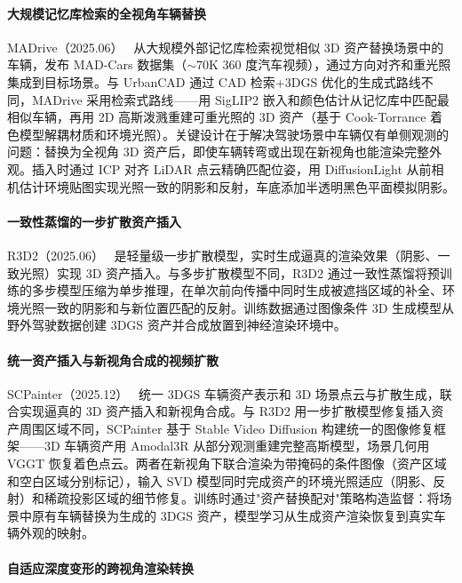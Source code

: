 \paragraph{大规模记忆库检索的全视角车辆替换}

MADrive（2025.06）~\cite{2506_21520} 从大规模外部记忆库检索视觉相似 3D 资产替换场景中的车辆，发布 MAD-Cars 数据集（$\sim$70K 360 度汽车视频），通过方向对齐和重光照集成到目标场景。与 UrbanCAD 通过 CAD 检索+3DGS 优化的生成式路线不同，MADrive 采用检索式路线——用 SigLIP2 嵌入和颜色估计从记忆库中匹配最相似车辆，再用 2D 高斯泼溅重建可重光照的 3D 资产（基于 Cook-Torrance 着色模型解耦材质和环境光照）。关键设计在于解决驾驶场景中车辆仅有单侧观测的问题：替换为全视角 3D 资产后，即使车辆转弯或出现在新视角也能渲染完整外观。插入时通过 ICP 对齐 LiDAR 点云精确匹配位姿，用 DiffusionLight 从前相机估计环境贴图实现光照一致的阴影和反射，车底添加半透明黑色平面模拟阴影。

\paragraph{一致性蒸馏的一步扩散资产插入}

R3D2（2025.06）~\cite{2506_07826} 是轻量级一步扩散模型，实时生成逼真的渲染效果（阴影、一致光照）实现 3D 资产插入。与多步扩散模型不同，R3D2 通过一致性蒸馏将预训练的多步模型压缩为单步推理，在单次前向传播中同时生成被遮挡区域的补全、环境光照一致的阴影和与新位置匹配的反射。训练数据通过图像条件 3D 生成模型从野外驾驶数据创建 3DGS 资产并合成放置到神经渲染环境中。

\paragraph{统一资产插入与新视角合成的视频扩散}

SCPainter（2025.12）~\cite{2512_22706} 统一 3DGS 车辆资产表示和 3D 场景点云与扩散生成，联合实现逼真的 3D 资产插入和新视角合成。与 R3D2 用一步扩散模型修复插入资产周围区域不同，SCPainter 基于 Stable Video Diffusion 构建统一的图像修复框架——3D 车辆资产用 Amodal3R 从部分观测重建完整高斯模型，场景几何用 VGGT 恢复着色点云。两者在新视角下联合渲染为带掩码的条件图像（资产区域和空白区域分别标记），输入 SVD 模型同时完成资产的环境光照适应（阴影、反射）和稀疏投影区域的细节修复。训练时通过"资产替换配对"策略构造监督：将场景中原有车辆替换为生成的 3DGS 资产，模型学习从生成资产渲染恢复到真实车辆外观的映射。

\paragraph{自适应深度变形的跨视角渲染转换}


